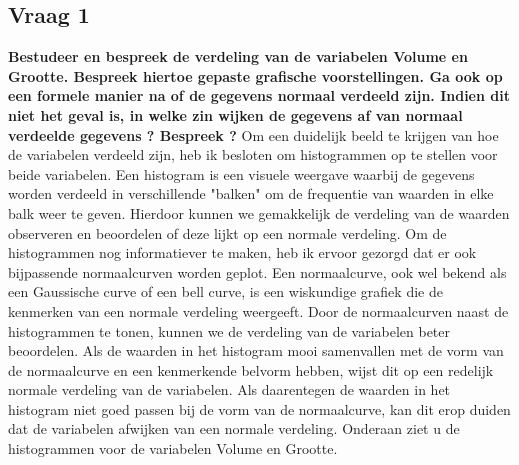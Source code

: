 \documentclass[12pt]{article}
\begin{document}
\subsection{Vraag 1}
\textbf{Bestudeer en bespreek de verdeling van de variabelen Volume en Grootte. Bespreek hiertoe gepaste grafische voorstellingen. Ga ook op een formele manier na of de gegevens normaal verdeeld zijn. Indien dit niet het geval is, in welke zin wijken de gegevens af van normaal verdeelde gegevens ? Bespreek ?}
\newline\newline
Om een duidelijk beeld te krijgen van hoe de variabelen verdeeld zijn, heb ik besloten om histogrammen op te stellen voor beide variabelen. 
Een histogram is een visuele weergave waarbij de gegevens worden verdeeld in verschillende "balken" om de frequentie van waarden in elke balk weer te geven. 
Hierdoor kunnen we gemakkelijk de verdeling van de waarden observeren en beoordelen of deze lijkt op een normale verdeling.
\newline\newline
Om de histogrammen nog informatiever te maken, heb ik ervoor gezorgd dat er ook bijpassende normaalcurven worden geplot. 
Een normaalcurve, ook wel bekend als een Gaussische curve of een bell curve, is een wiskundige grafiek die de kenmerken van een normale verdeling weergeeft. 
Door de normaalcurven naast de histogrammen te tonen, kunnen we de verdeling van de variabelen beter beoordelen. 
\newline\newline
Als de waarden in het histogram mooi samenvallen met de vorm van de normaalcurve en een kenmerkende belvorm hebben, wijst dit op een redelijk normale verdeling van de variabelen. 
Als daarentegen de waarden in het histogram niet goed passen bij de vorm van de normaalcurve, kan dit erop duiden dat de variabelen afwijken van een normale verdeling.
Onderaan ziet u de histogrammen voor de variabelen Volume en Grootte.
\newline\newline
\end{document}

